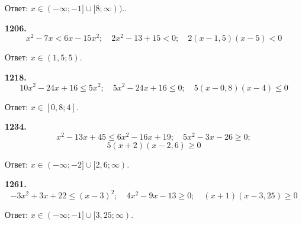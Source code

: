 \null \hspace*{\fill}Ответ: $x\in(-\infty;-1]\cup[8;\infty)).$.

\textbf{1206.} $$x^2-7x<6x-15x^2;\quad 2x^2-13+15<0;\quad 2(x-1,5)(x-5)<0$$

\begin{figure}[h!]
\end{figure}

\null \hspace*{\fill} Ответ: $x\in(1,5;5)$.

\newpage \textbf{1218.} $$10x^2-24x+16\leq 5x^2;\quad 5x^2-24x+16\leq 0;\quad 5(x-0,8)(x-4)\leq0$$

\begin{figure}[h!]
\end{figure}

\null \hspace*{\fill} Ответ: $x\in[0,8;4]$. 

\textbf{1234.} $$x^2-13x+45\leq 6x^2-16x+19;\quad 5x^2-3x-26\geq0;$$ $$ 5(x+2)(x-2,6)\geq0$$

\begin{figure}[h!]
\end{figure}

\null \hspace*{\fill} Ответ: $x\in(-\infty;-2]\cup[2,6;\infty)$. 

\textbf{1261.} $$-3x^2+3x+22\leq(x-3)^2;\quad 4x^2-9x-13\geq0;\quad(x+1)(x-3,25)\geq0$$

\begin{figure}[h!]
\end{figure}

\null \hspace*{\fill} Ответ: $x\in(-\infty;-1]\cup[3,25;\infty)$. 